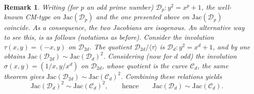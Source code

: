 \documentclass[a4paper,12pt]{amsart}
\def\cC{{\mathcal C}}
\def\cD{{\mathcal D}}
\numberwithin{equation}{section}
\theoremstyle{plain}
\numberwithin{thm}{section}
\newtheorem{remark}[thm]{Remark}
\begin{document}
\begin{remark} \rm{
Writing (for $p$ an odd prime number)
$\cD_p\colon y^2=x^p+1$, the well-known CM-type on $\textrm{Jac}(\cD_p)$
and the one presented above on
$\textrm{Jac}(\cD_p)$ coincide.
As a consequence, the two Jacobians are isogenous.
An alternative way to see this, is as follows (notations as before).   
Consider the involution $\tau(x,y)=(-x,y)$ on $\cD_{2d}$.  
The quotient $\cD_{2d}/\langle\tau\rangle$ is $\cD_d\colon y^2=x^d+1$, 
and by \cite[Theorem~5]{Pau} one obtains 
$\textrm{Jac}(\cD_{2d})\sim \textrm{Jac}(\cD_d)^2$.  
Considering (now for $d$ odd) the involution $\sigma(x,y)=(1/x,y/x^d)$ on $\cD_{2d}$, 
whose quotient is the curve $\cC_d$, the same theorem gives 
$\textrm{Jac}(\cD_{2d})\sim \textrm{Jac}(\cC_d)^2$.  
Combining these relations yields
\[
  \textrm{Jac}(\cD_d)^2 \sim \textrm{Jac}(\cC_d)^2,
  \qquad\text{hence}\qquad
  \textrm{Jac}(\cD_d)\sim \textrm{Jac}(\cC_d).
\]
}
\end{remark}






\end{document}
